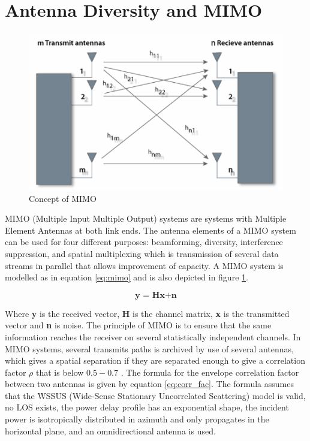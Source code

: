 \section{Antenna Diversity and MIMO}

\begin{figure}[H]
\centering 
\includegraphics[scale = 0.4]{figures/ch1/mimo.png}
\caption{Concept of MIMO \citep{silvus2019}}
\label{fig:mimo}
\end{figure}

MIMO (Multiple Input Multiple Output) systems are systems with Multiple Element Antennas at both link ends. The antenna elements of a MIMO system can be used for four different purposes: beamforming, diversity, interference suppression, and spatial multiplexing which is transmission of several data streams in parallel that allows improvement of capacity.\citep{molisch2011} A MIMO system is modelled as in equation \ref{eq:mimo} and is also depicted in figure \ref{fig:mimo}.

\begin{equation}\label{eq:mimo}
\textbf{y = Hx+n}
\end{equation}  

Where \textbf{y} is the received vector, \textbf{H} is the channel matrix, \textbf{x} is the transmitted vector and \textbf{n} is noise. The principle of MIMO is to ensure that the same information reaches the receiver on several
statistically independent channels. In MIMO systems, several transmits paths is archived by use of several antennas, which gives a spatial separation if they are separated enough to give a correlation factor $\rho$ that is below $0.5 - 0.7$ \citep{molisch2011}. The formula for the envelope correlation factor between two antennas is given by equation \ref{eq:corr_fac}. The formula assumes that the WSSUS (Wide-Sense Stationary Uncorrelated Scattering) model is valid, no LOS exists, the power delay profile has an exponential shape, the incident power is isotropically distributed in azimuth and only propagates in the horizontal plane, and an omnidirectional antenna is used.

